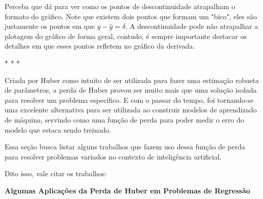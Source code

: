 Perceba que dá para ver como os pontos de descontinuidade atrapalham o formato do gráfico. Note que existem dois pontos que formam um "bico", eles são justamente os pontos em que $y - \hat{y} = \delta$. A descontinuidade pode não atrapalhar a plotagem do gráfico de forma geral, contudo, é sempre importante destacar os detalhes em que esses pontos refletem no gráfico da derivada.

\medskip
\begin{center}
 * * *
\end{center}
\medskip

Criada por Huber como intuito de ser utilizada para fazer uma estimação robusta de parâmetros, a perda de Huber provou ser muito mais que uma solução isolada para resolver um problema específico. E com o passar do tempo, foi tornando-se uma excelente alternativa para ser utilizada ao construir modelos de aprendizado de máquina, servindo como uma função de perda para poder medir o erro do modelo que estaca sendo treinado.

Essa seção busca listar alguns trabalhos que fazem uso dessa função de perda para resolver problemas variados no contexto de inteligência artificial.

Dito isso, vale citar os trabalhos:

\textbf{Algumas Aplicações da Perda de Huber em Problemas de Regressão} 
\vspace{1em}

